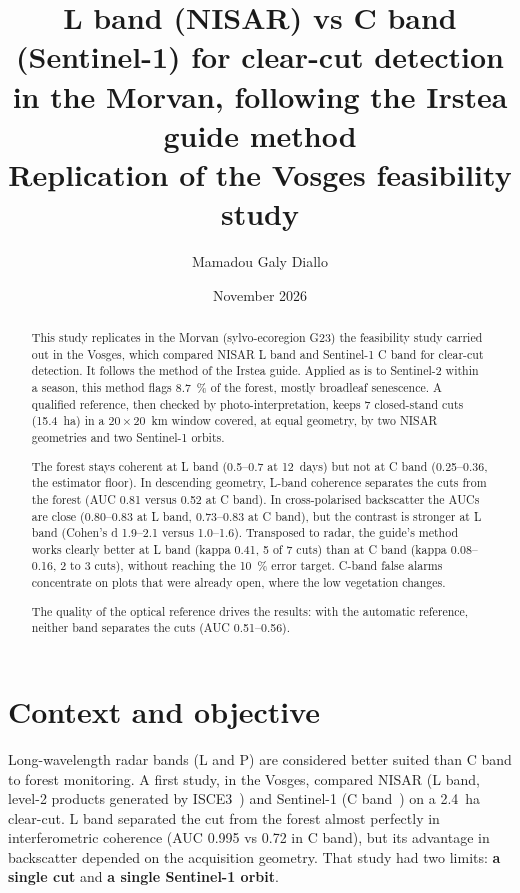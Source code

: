 \documentclass[11pt,a4paper]{article}
\title{L band (NISAR) vs C band (Sentinel-1) for clear-cut detection\\
in the Morvan, following the Irstea guide method\\[0.4em]
\large Replication of the Vosges feasibility study}
\author{Mamadou Galy Diallo}
\date{November 2026}
\begin{document}
\maketitle

\begin{abstract}
\noindent
This study replicates in the Morvan (sylvo-ecoregion G23) the feasibility study carried out in the Vosges, which
compared NISAR L band and Sentinel-1 C band for clear-cut detection. It follows the method of the Irstea guide.
Applied as is to Sentinel-2 within a season, this method flags 8.7~\% of the forest, mostly broadleaf senescence.
A qualified reference, then checked by photo-interpretation, keeps 7 closed-stand cuts (15.4~ha) in a
$20\times20$~km window covered, at equal geometry, by two NISAR geometries and two Sentinel-1 orbits.

The forest stays coherent at L band (0.5--0.7 at 12~days) but not at C band (0.25--0.36, the estimator floor). In
descending geometry, L-band coherence separates the cuts from the forest (AUC 0.81 versus 0.52 at C band). In
cross-polarised backscatter the AUCs are close (0.80--0.83 at L band, 0.73--0.83 at C band), but the contrast is
stronger at L band (Cohen's d 1.9--2.1 versus 1.0--1.6). Transposed to radar, the guide's method works clearly
better at L band (kappa 0.41, 5 of 7 cuts) than at C band (kappa 0.08--0.16, 2 to 3 cuts), without reaching the
10~\% error target. C-band false alarms concentrate on plots that were already open, where the low vegetation
changes.

The quality of the optical reference drives the results: with the automatic reference, neither band separates the
cuts (AUC 0.51--0.56).
\end{abstract}

\tableofcontents
\newpage

\section{Context and objective}

Long-wavelength radar bands (L and P) are considered better suited than C band to forest monitoring. A first
study, in the Vosges, compared NISAR (L band, level-2 products generated by ISCE3~\cite{isce3})
and Sentinel-1 (C band~\cite{torres2012sentinel1}) on a 2.4~ha clear-cut. L band separated the cut from the forest
almost perfectly in interferometric coherence (AUC 0.995 vs 0.72 in C band), but its advantage in backscatter
depended on the acquisition geometry. That study had two limits: \textbf{a single cut} and \textbf{a single
Sentinel-1 orbit}.
\end{document}
